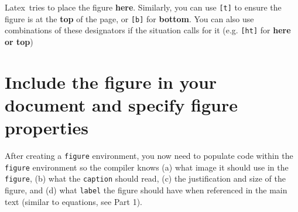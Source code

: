 \documentclass[10pt]{article}
\renewcommand{\LaTeX}{Latex}
\begin{document}
\LaTeX\ tries to place the figure \textbf{here}. Similarly, you can use \lstinline{[t]} to ensure the figure is at the \textbf{top} of the page, or \lstinline{[b]} for \textbf{bottom}. You can also use combinations of these designators if the situation calls for it (e.g. \lstinline{[ht]} for \textbf{here or top})




\section{Include the figure in your document and specify figure properties}
After creating a \lstinline{figure} environment, you now need to populate code within the \lstinline{figure} environment so the compiler knows (a) what image it should use in the \lstinline{figure}, (b) what the \lstinline{caption} should read, (c) the justification and size of the figure, and (d) what \lstinline{label} the figure should have when referenced in the main text (similar to equations, see Part 1).
\end{document}
